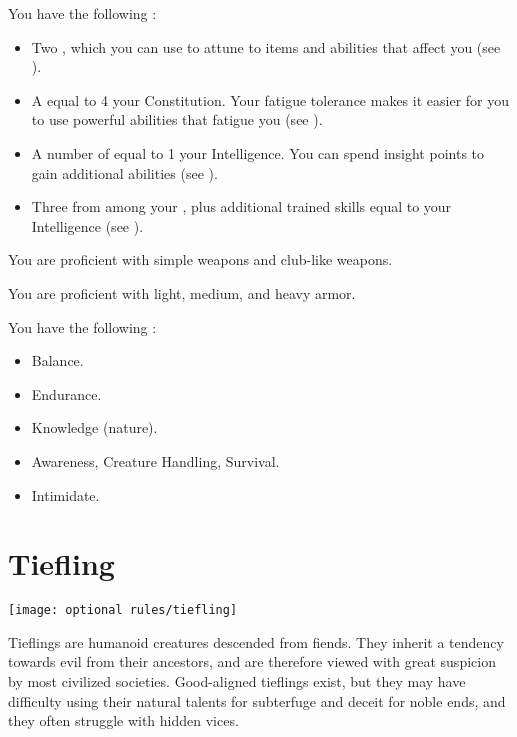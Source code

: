          You have the following :
        \begin{itemize}
            \item Two , which you can use to attune to items and abilities that affect you (see ).
            \item A  equal to 4 \add your Constitution.
                Your fatigue tolerance makes it easier for you to use powerful abilities that fatigue you (see ).
            \item A number of  equal to 1 \add your Intelligence.
                You can spend insight points to gain additional abilities (see ).
            \item Three  from among your , plus additional trained skills equal to your Intelligence (see ).
        \end{itemize}

        You are proficient with simple weapons and club-like weapons.

        You are proficient with light, medium, and heavy armor.

        You have the following :
        \begin{itemize}
            \item {} Balance.
            \item {} Endurance.
            \item {} Knowledge (nature).
            \item {} Awareness, Creature Handling, Survival.
            \item {} Intimidate.
        \end{itemize}

\section{Tiefling}
    \texttt{[image: optional rules/tiefling]}

    Tieflings are humanoid creatures descended from fiends.
    They inherit a tendency towards evil from their ancestors, and are therefore viewed with great suspicion by most civilized societies.
    Good-aligned tieflings exist, but they may have difficulty using their natural talents for subterfuge and deceit for noble ends, and they often struggle with hidden vices.

